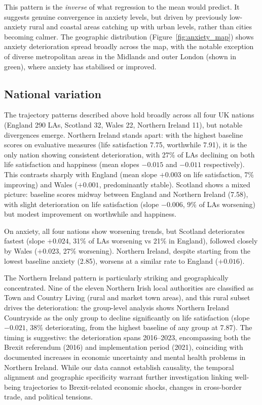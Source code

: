 \documentclass[12pt,a4paper]{article}
\begin{document}
This pattern is the \textit{inverse} of what regression to the mean would predict. It suggests genuine convergence in anxiety levels, but driven by previously low-anxiety rural and coastal areas catching up with urban levels, rather than cities becoming calmer. The geographic distribution (Figure~\ref{fig:anxiety_map}) shows anxiety deterioration spread broadly across the map, with the notable exception of diverse metropolitan areas in the Midlands and outer London (shown in green), where anxiety has stabilised or improved.

\subsection{National variation}

The trajectory patterns described above hold broadly across all four UK nations (England 290 LAs, Scotland 32, Wales 22, Northern Ireland 11), but notable divergences emerge. Northern Ireland stands apart: with the highest baseline scores on evaluative measures (life satisfaction 7.75, worthwhile 7.91), it is the only nation showing consistent deterioration, with 27\% of LAs declining on both life satisfaction and happiness (mean slopes $-0.015$ and $-0.011$ respectively). This contrasts sharply with England (mean slope $+0.003$ on life satisfaction, 7\% improving) and Wales ($+0.001$, predominantly stable). Scotland shows a mixed picture: baseline scores midway between England and Northern Ireland (7.58), with slight deterioration on life satisfaction (slope $-0.006$, 9\% of LAs worsening) but modest improvement on worthwhile and happiness.

On anxiety, all four nations show worsening trends, but Scotland deteriorates fastest (slope $+0.024$, 31\% of LAs worsening vs 21\% in England), followed closely by Wales ($+0.023$, 27\% worsening). Northern Ireland, despite starting from the lowest baseline anxiety (2.85), worsens at a similar rate to England ($+0.016$).

The Northern Ireland pattern is particularly striking and geographically concentrated. Nine of the eleven Northern Irish local authorities are classified as Town and Country Living (rural and market town areas), and this rural subset drives the deterioration: the group-level analysis shows Northern Ireland Countryside as the only group to decline significantly on life satisfaction (slope $-0.021$, 38\% deteriorating, from the highest baseline of any group at 7.87). The timing is suggestive: the deterioration spans 2016--2023, encompassing both the Brexit referendum (2016) and implementation period (2021), coinciding with documented increases in economic uncertainty  and mental health problems  in Northern Ireland. While our data cannot establish causality, the temporal alignment and geographic specificity warrant further investigation linking well-being trajectories to Brexit-related economic shocks, changes in cross-border trade, and political tensions.
\end{document}

